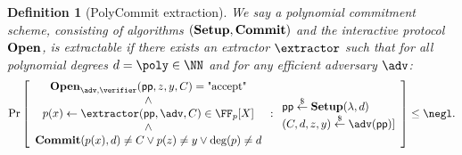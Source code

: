 \documentclass{article}
\newtheorem{definition}{Definition}
\begin{document}
\begin{definition}[PolyCommit extraction]
We say a polynomial commitment scheme, consisting of algorithms $(\textbf{{Setup}},\textbf{{Commit}})$ and the interactive protocol $\textbf{{Open}}$, is extractable if there exists an extractor $\extractor$ such that for all polynomial degrees $d=\poly\in \NN$ and for any efficient adversary $\adv$:
	\[        
                \Pr\left[\begin{array}{c}\open_{\adv,\verifier}(\crs,z,y,C)=\text{"accept"}\\
                \wedge\\
                p(x)\gets\extractor(\crs,\adv,C)\in \FF_p[X]\\
                \wedge\\
               \commit(p(x),d)\neq C\vee p(z)\neq y \vee \deg(p)\neq d
                 \end{array}  : 
                \begin{array}{l} 
                      \crs \sample \setup(\lambda, d) \\
                      (C,d,z,y)\sample \adv(\crs)]
                      
                \end{array} 
        \right] \leq \negl.
\]
\end{definition}
\end{document}
